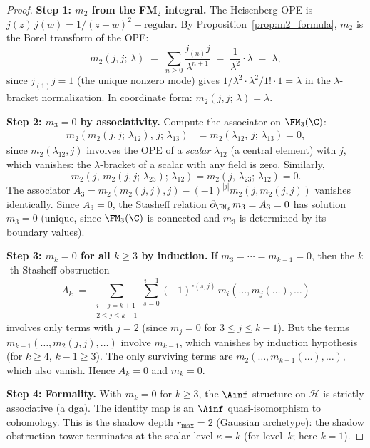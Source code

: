\begin{proof}
\textbf{Step 1: $m_2$ from the FM$_2$ integral.}
The Heisenberg OPE is $j(z)\, j(w) = 1/(z-w)^2 +
\text{regular}$. By Proposition~\ref{prop:m2_formula},
$m_2$ is the Borel transform of the OPE:
\[
m_2(j, j;\, \lambda)
\;=\;
\sum_{n \ge 0} \frac{j_{(n)} j}{\lambda^{n+1}}
\;=\;
\frac{1}{\lambda^2} \cdot \lambda
\;=\;
\lambda,
\]
since $j_{(1)} j = 1$ (the unique nonzero mode) gives
$1/\lambda^2 \cdot \lambda^2/1! \cdot 1 = \lambda$
in the $\lambda$-bracket normalization. In coordinate
form: $m_2(j, j;\, \lambda) = \lambda$.

\medskip
\textbf{Step 2: $m_3 = 0$ by associativity.}
Compute the associator on $\FM_3(\C)$:
\begin{align*}
m_2(m_2(j,j;\,\lambda_{12}),\, j;\, \lambda_{13})
&= m_2(\lambda_{12},\, j;\, \lambda_{13})
= 0,
\end{align*}
since $m_2(\lambda_{12}, j)$ involves the OPE of a
\emph{scalar} $\lambda_{12}$ (a central element) with $j$,
which vanishes: the $\lambda$-bracket of a scalar with any
field is zero. Similarly,
\[
m_2(j,\, m_2(j,j;\,\lambda_{23});\, \lambda_{12})
= m_2(j,\, \lambda_{23};\, \lambda_{12})
= 0.
\]
The associator $A_3 = m_2(m_2(j,j),j) -
(-1)^{|j|} m_2(j,m_2(j,j))$ vanishes identically.
Since $A_3 = 0$, the Stasheff relation
$\partial_{\FM_3}\, m_3 = A_3 = 0$ has solution
$m_3 = 0$ (unique, since $\FM_3(\C)$ is connected
and $m_3$ is determined by its boundary values).

\medskip
\textbf{Step 3: $m_k = 0$ for all $k \ge 3$ by induction.}
If $m_3 = \cdots = m_{k-1} = 0$, then the $k$-th
Stasheff obstruction
\[
A_k \;=\;
\sum_{\substack{i+j=k+1 \\ 2 \le j \le k-1}}
\sum_{s=0}^{i-1}
(-1)^{\epsilon(s,j)}\,
m_i(\ldots, m_j(\ldots), \ldots)
\]
involves only terms with $j = 2$ (since $m_j = 0$ for
$3 \le j \le k-1$). But the terms
$m_{k-1}(\ldots, m_2(j,j), \ldots)$ involve
$m_{k-1}$, which vanishes by induction hypothesis
(for $k \ge 4$, $k-1 \ge 3$). The only surviving
terms are $m_2(\ldots, m_{k-1}(\ldots), \ldots)$,
which also vanish. Hence $A_k = 0$ and $m_k = 0$.

\medskip
\textbf{Step 4: Formality.}
With $m_k = 0$ for $k \ge 3$, the $\Ainf$ structure
on $\mathcal{H}$ is strictly associative (a dga).
The identity map is an $\Ainf$ quasi-isomorphism to
cohomology. This is the shadow depth $r_{\max} = 2$
(Gaussian archetype): the shadow obstruction tower
terminates at the scalar level $\kappa = k$ (for level~$k$; here $k = 1$).
\end{proof}

